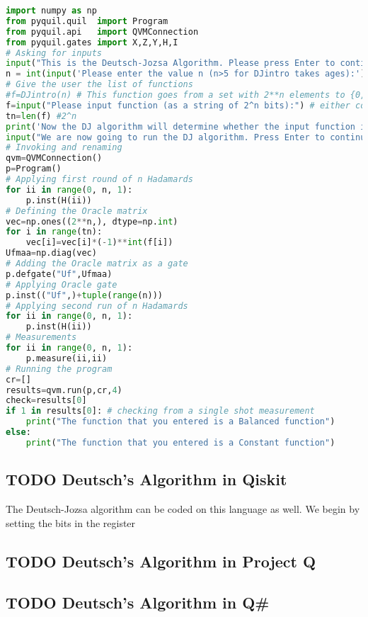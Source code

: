 \begin{lstlisting}[language=Python,caption={Deutsch's algorithm with pyQuil (general n)},label={lst:DAqvm},frame=single]
import numpy as np
from pyquil.quil  import Program
from pyquil.api   import QVMConnection 
from pyquil.gates import X,Z,Y,H,I 
# Asking for inputs
input("This is the Deutsch-Jozsa Algorithm. Please press Enter to continue...")
n = int(input('Please enter the value n (n>5 for DJintro takes ages):'))
# Give the user the list of functions
#f=DJintro(n) # This function goes from a set with 2**n elements to {0,1}
f=input("Please input function (as a string of 2^n bits):") # either constant or balanced
tn=len(f) #2^n
print('Now the DJ algorithm will determine whether the input function is Balanced or Constant\n')
input("We are now going to run the DJ algorithm. Press Enter to continue...")
# Invoking and renaming
qvm=QVMConnection()
p=Program() 
# Applying first round of n Hadamards
for ii in range(0, n, 1):
    p.inst(H(ii))
# Defining the Oracle matrix
vec=np.ones((2**n,), dtype=np.int)
for i in range(tn):
    vec[i]=vec[i]*(-1)**int(f[i])
Ufmaa=np.diag(vec)
# Adding the Oracle matrix as a gate
p.defgate("Uf",Ufmaa)
# Applying Oracle gate
p.inst(("Uf",)+tuple(range(n)))
# Applying second run of n Hadamards
for ii in range(0, n, 1):
    p.inst(H(ii))
# Measurements 
for ii in range(0, n, 1):
    p.measure(ii,ii)
# Running the program
cr=[] 
results=qvm.run(p,cr,4) 
check=results[0]
if 1 in results[0]: # checking from a single shot measurement
    print("The function that you entered is a Balanced function")
else:
    print("The function that you entered is a Constant function")
\end{lstlisting}

\subsection{TODO Deutsch's Algorithm in Qiskit}
The Deutsch-Jozsa algorithm can be coded on this language as well. We begin by setting the bits in the register 

\subsection{TODO Deutsch's Algorithm in Project Q}

\subsection{TODO Deutsch's Algorithm in Q\#}
